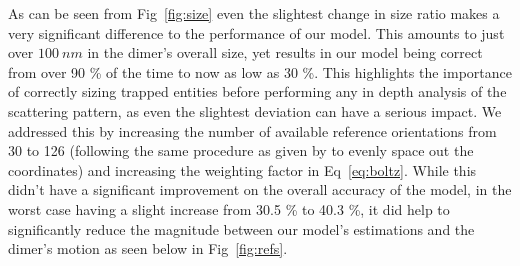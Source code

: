 As can be seen from Fig~\ref{fig:size}  even the slightest change in size ratio makes a very significant difference to the performance of our model. This amounts to just over $100 \ nm$ in the dimer's overall size, yet results in our model being correct from over 90 \% of the time to now as low as 30 \%. This highlights the importance of correctly sizing trapped entities before performing any in depth analysis of the scattering pattern, as even the slightest deviation can have a serious impact. We addressed this by increasing the number of available reference orientations from 30 to 126 (following the same procedure as given by \cite{Reyuthor2006} to evenly space out the coordinates) and increasing the weighting factor in Eq~\ref{eq:boltz}. While this didn't have a significant improvement on the overall accuracy of the model, in the worst case having a slight increase from 30.5 \% to 40.3 \%, it did help to significantly reduce the magnitude between our model's estimations and the dimer's motion as seen below in Fig~\ref{fig:refs}.
